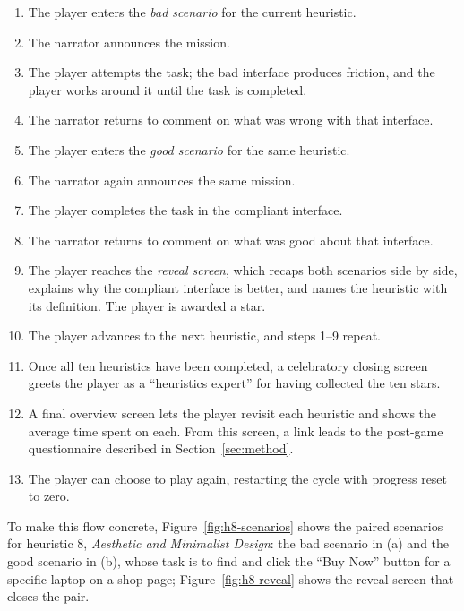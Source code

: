 \begin{enumerate}
  \item The player enters the \emph{bad scenario} for the current heuristic.
  \item The narrator announces the mission.
  \item The player attempts the task; the bad interface produces friction, and the player works around it until the task is completed.
  \item The narrator returns to comment on what was wrong with that interface.
  \item The player enters the \emph{good scenario} for the same heuristic.
  \item The narrator again announces the same mission.
  \item The player completes the task in the compliant interface.
  \item The narrator returns to comment on what was good about that interface.
  \item The player reaches the \emph{reveal screen}, which recaps both scenarios side by side, explains why the compliant interface is better, and names the heuristic with its definition. The player is awarded a star.
  \item The player advances to the next heuristic, and steps 1--9 repeat.
  \item Once all ten heuristics have been completed, a celebratory closing screen greets the player as a ``heuristics expert'' for having collected the ten stars.
  \item A final overview screen lets the player revisit each heuristic and shows the average time spent on each. From this screen, a link leads to the post-game questionnaire described in Section~\ref{sec:method}.
  \item The player can choose to play again, restarting the cycle with progress reset to zero.
\end{enumerate}

To make this flow concrete, Figure~\ref{fig:h8-scenarios} shows the paired scenarios for heuristic 8, \emph{Aesthetic and Minimalist Design}: the bad scenario in (a) and the good scenario in (b), whose task is to find and click the ``Buy Now'' button for a specific laptop on a shop page; Figure~\ref{fig:h8-reveal} shows the reveal screen that closes the pair.

